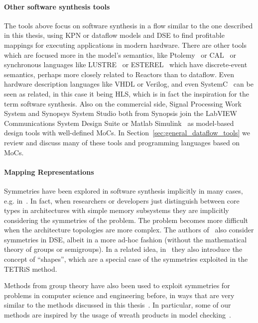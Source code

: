 \paragraph{Other software synthesis tools}
The tools above focus on software synthesis in a flow similar to the one described in this thesis, using \ac{KPN} or dataflow models and \ac{DSE} to find profitable mappings for executing applications in modern hardware.
There are other tools which are focused more in the model's semantics, like Ptolemy~\cite{Ptolemaeus:14:SystemDesign} or CAL~\cite{eker2003cal} or synchronous languages like LUSTRE~\cite{pilaud1987lustre} or ESTEREL~\cite{boussinot1991esterel} which have discrete-event semantics, perhaps more closely related to Reactors than to dataflow.
Even hardware description languages like VHDL or Verilog, and even SystemC~\cite{semantics_systemc} can be seen as related, in this case it being \ac{HLS}, which is in fact the inspiration for the term software synthesis.
Also on the commercial side, Signal Processing Work System and Synopsys System Studio both from Synopsis join the LabVIEW Communications System Design Suite or Matlab Simulink~\cite{klikpo2016modeling} as model-based design tools with well-defined \acp{MoC}.
In Section~\ref{sec:general_dataflow_tools} we review and discuss many of these tools and programming languages based on \acp{MoC}.

\paragraph{Mapping Representations}
Symmetries have been explored in software synthesis implicitly in many cases, e.g. in~\cite{singh2010communication,thompson2013exploiting}. 
In fact, when researchers or developers just distinguish between core types in architectures with simple memory subsystems they are implicitly considering the symmetries of the problem.
The problem becomes more difficult when the architecture topologies are more complex.
The authors of~\cite{schwarzer2017symmetry} also consider symmetries in \ac{DSE}, albeit in a more ad-hoc fashion (without the mathematical theory of groups or semigroups).
In a related idea, in~\cite{shapes} they also introduce the concept of ``shapes'', which are a special case of the symmetries exploited in the \ac{TETRiS} method.

Methods from group theory have also been used to exploit symmetries for problems in computer science and engineering before, in ways that are very similar to the methods discussed in this thesis~\cite{crawford1996symmetry,clarke1998symmetry}.
In particular, some of our methods are inspired by the usage of wreath products in model checking~\cite{donaldson2009constructive}.

